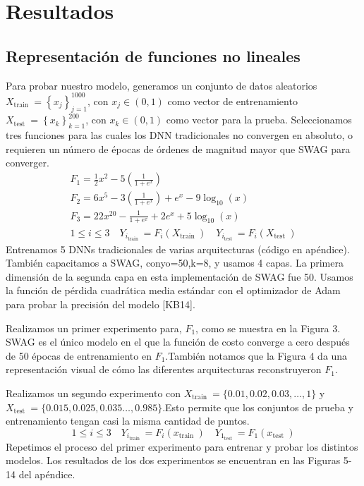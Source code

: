 \documentclass[10pt]{article}
\begin{document}
\section{Resultados}
\subsection{Representación de funciones no lineales}
Para probar nuestro modelo, generamos un conjunto de datos aleatorios $X_{\text {train }}=\left\{x_{j}\right\}_{j=1}^{1000}$, con $x_{j} \in(0,1)$ como vector de entrenamiento $X_{\text {test }}=\left\{x_{k}\right\}_{k=1}^{200}$, con $x_{k} \in(0,1)$ como vector para la prueba. Seleccionamos
tres funciones para las cuales los DNN tradicionales no convergen en absoluto, o requieren un número de épocas de órdenes de magnitud mayor que SWAG para converger.
$$
\begin{gathered}
F_{1}=\frac{1}{2} x^{2}-5\left(\frac{1}{1+e^{x}}\right) \\
F_{2}=6 x^{5}-3\left(\frac{1}{1+e^{x}}\right)+e^{x}-9 \log _{10}(x) \\
F_{3}=22 x^{20}-\frac{1}{1+e^{x}}+2 e^{x}+5 \log _{10}(x) \\
1 \leq i \leq 3 \quad Y_{i_{\text {train }}}=F_{i}\left(X_{\text {train }}\right) \quad Y_{i_{\text {test }}}=F_{i}\left(X_{\text {test }}\right)
\end{gathered}
$$
Entrenamos 5 DNNs tradicionales de varias arquitecturas (código en apéndice). También capacitamos a SWAG, conyo=50,k=8, y usamos 4 capas. La primera dimensión de la segunda capa en esta implementación de
SWAG fue 50. Usamos la función de pérdida cuadrática media estándar con el optimizador de Adam para probar la precisión del modelo [KB14].

Realizamos un primer experimento para, $F_{1}$, como se muestra en la Figura 3. SWAG es el único modelo en el que la función de costo converge a cero después de 50 épocas de entrenamiento en $F_{1}$.También notamos que la Figura 4 da una representación visual de cómo las diferentes arquitecturas reconstruyeron $F_{1}$.

Realizamos un segundo experimento con $X_{\text {train }}=\{0.01,0.02,0.03, \ldots, 1\}$ y $X_{\text {test }}=\{0.015,0.025,0.035 \ldots, 0.985\}$.Esto permite que los conjuntos de prueba y entrenamiento tengan casi la misma cantidad de puntos.
$$
1 \leq i \leq 3 \quad Y_{i_{\text {train }}}=F_{i}\left(x_{\text {train }}\right) \quad Y_{1_{\text {test }}}=F_{1}\left(x_{\text {test }}\right)
$$
Repetimos el proceso del primer experimento para entrenar y probar los distintos modelos. Los resultados de los dos experimentos se encuentran en las Figuras 5-14 del apéndice.\\
\end{document}

